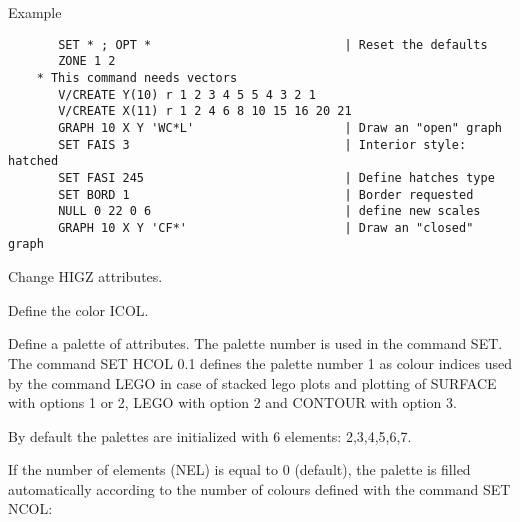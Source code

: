    \par
Example 
\begin{verbatim}
       SET * ; OPT *                           | Reset the defaults
       ZONE 1 2
    * This command needs vectors
       V/CREATE Y(10) r 1 2 3 4 5 5 4 3 2 1
       V/CREATE X(11) r 1 2 4 6 8 10 15 16 20 21
       GRAPH 10 X Y 'WC*L'                     | Draw an "open" graph
       SET FAIS 3                              | Interior style: hatched
       SET FASI 245                            | Define hatches type
       SET BORD 1                              | Border requested
       NULL 0 22 0 6                           | define new scales
       GRAPH 10 X Y 'CF*'                      | Draw an "closed" graph
\end{verbatim}

\ENDCMD
{}
\ifMENUtext
   \par
Change HIGZ attributes.  


\fi


\BEGARG
{}
\ENDARG

   \par
Define the color ICOL.  

\ENDCMD


\BEGARG
{}
\ENDARG

   \par
Define a palette of attributes.  The palette number is used in the command 
   SET. The command SET HCOL 0.1 defines the palette number 1 as colour 
   indices used by the command LEGO in case of stacked lego plots and plotting 
   of SURFACE with options 1 or 2, LEGO with option 2 and CONTOUR with option 
   3.  

   \par
By default the palettes are initialized with 6 elements:  2,3,4,5,6,7.  

   \par
If the number of elements (NEL) is equal to 0 (default), the palette is 
   filled automatically according to the number of colours defined with the 
   command SET NCOL:  

